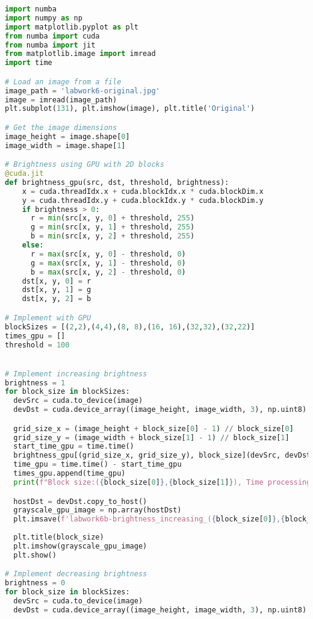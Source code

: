 \documentclass[12pt]{article}
\begin{document}
\begin{lstlisting}[language=Python]
import numba
import numpy as np
import matplotlib.pyplot as plt
from numba import cuda
from numba import jit
from matplotlib.image import imread
import time

# Load an image from a file
image_path = 'labwork6-original.jpg'
image = imread(image_path)
plt.subplot(131), plt.imshow(image), plt.title('Original')

# Get the image dimensions
image_height = image.shape[0]
image_width = image.shape[1]

# Brightness using GPU with 2D blocks
@cuda.jit
def brightness_gpu(src, dst, threshold, brightness):
    x = cuda.threadIdx.x + cuda.blockIdx.x * cuda.blockDim.x
    y = cuda.threadIdx.y + cuda.blockIdx.y * cuda.blockDim.y
    if brightness > 0:
      r = min(src[x, y, 0] + threshold, 255)
      g = min(src[x, y, 1] + threshold, 255)
      b = min(src[x, y, 2] + threshold, 255)
    else:
      r = max(src[x, y, 0] - threshold, 0)
      g = max(src[x, y, 1] - threshold, 0)
      b = max(src[x, y, 2] - threshold, 0)
    dst[x, y, 0] = r
    dst[x, y, 1] = g
    dst[x, y, 2] = b

# Implement with GPU
blockSizes = [(2,2),(4,4),(8, 8),(16, 16),(32,32),(32,22)]
times_gpu = []
threshold = 100


# Implement increasing brightness
brightness = 1
for block_size in blockSizes:
  devSrc = cuda.to_device(image)
  devDst = cuda.device_array((image_height, image_width, 3), np.uint8)

  grid_size_x = (image_height + block_size[0] - 1) // block_size[0]
  grid_size_y = (image_width + block_size[1] - 1) // block_size[1]
  start_time_gpu = time.time()
  brightness_gpu[(grid_size_x, grid_size_y), block_size](devSrc, devDst, threshold, brightness)
  time_gpu = time.time() - start_time_gpu
  times_gpu.append(time_gpu)
  print(f"Block size:({block_size[0]},{block_size[1]}), Time processing on GPU: {time_gpu}s")

  hostDst = devDst.copy_to_host()
  grayscale_gpu_image = np.array(hostDst)
  plt.imsave(f'labwork6b-brightness_increasing_({block_size[0]},{block_size[1]}).jpg', grayscale_gpu_image, cmap='gray')
  
  plt.title(block_size)
  plt.imshow(grayscale_gpu_image)
  plt.show()

# Implement decreasing brightness
brightness = 0
for block_size in blockSizes:
  devSrc = cuda.to_device(image)
  devDst = cuda.device_array((image_height, image_width, 3), np.uint8)


\end{lstlisting}
\end{document}
